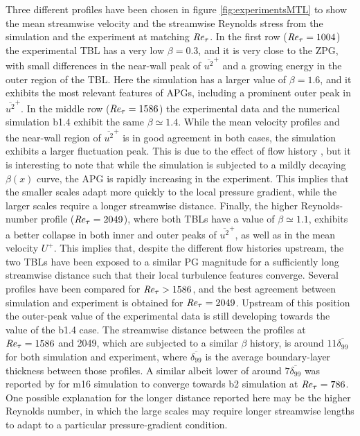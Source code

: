 Three different profiles have been chosen in figure \ref{fig:experimentsMTL} to show the mean streamwise velocity and the streamwise Reynolds stress from the simulation and the experiment at matching $\mbox{\textit{Re}}_{\tau}$. In the first row ($\mbox{\textit{Re}}_{\tau}=1004$) the experimental TBL has a very low $\beta=0.3$, and it is very close to the ZPG, with small differences in the near-wall peak of $\overline{u^2}^+$ and a growing energy in the outer region of the TBL.
Here the simulation has a larger value of $\beta=1.6$, and it exhibits the most relevant features of APGs, including a prominent outer peak in $\overline{u^2}^+$.
In the middle row ($\mbox{\textit{Re}}_{\tau}=1586$) the experimental data and the numerical simulation b1.4 exhibit the same  $\beta \simeq 1.4$. While the mean velocity profiles and the near-wall region of $\overline{u^2}^+$ is in good agreement in both cases, the simulation exhibits a larger fluctuation peak. This is due to the effect of flow history \citep{bobke2017, tanarro_2020}, but it is interesting to note that while the simulation is subjected to a mildly decaying $\beta(x)$ curve, the APG is rapidly increasing in the experiment. This implies that the smaller scales adapt more quickly to the local pressure gradient, while the larger scales require a longer streamwise distance.  
Finally, the higher Reynolds-number profile ($\mbox{\textit{Re}}_{\tau}=2049$), where both TBLs have a value of $\beta \simeq 1.1$, exhibits a better collapse in both inner and outer peaks of $\overline{u^2}^+$, as well as in the mean velocity $U^+$.
This implies that, despite the different flow histories upstream, the two TBLs have been exposed to a similar PG magnitude for a sufficiently long streamwise distance such that their local turbulence features converge. Several profiles have been compared for $\mbox{\textit{Re}}_{\tau}>1586$, and the best agreement between simulation and experiment is obtained for $\mbox{\textit{Re}}_{\tau}=2049$. Upstream of this position the outer-peak value of the experimental data is still developing towards the value of the b1.4 case. The streamwise distance between the profiles at $\mbox{\textit{Re}}_{\tau}=1586$ and 2049, which are subjected to a similar $\beta$ history, is around $11 \overline{\delta_{99}}$ for both simulation and experiment, where $\overline{\delta_{99}}$ is the average boundary-layer thickness between those profiles. A similar albeit lower of around $7\overline{\delta_{99}} $ was reported by \cite{bobke2017} for m16 simulation to converge towards b2 simulation at $\mbox{\textit{Re}}_{\tau}=786$. One possible explanation for the longer distance reported here may be the higher Reynolds number, in which the large scales may require longer streamwise lengths to adapt to a particular pressure-gradient condition.


